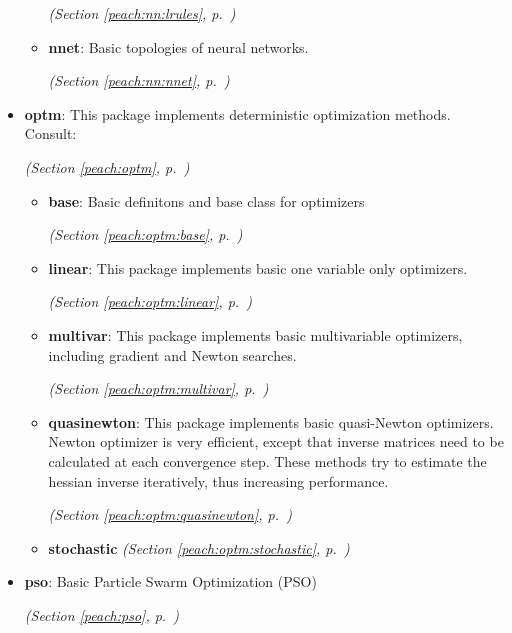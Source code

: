 \begin{itemize}
\begin{itemize}
  \textit{(Section \ref{peach:nn:lrules}, p.~\pageref{peach:nn:lrules})}

    \item \textbf{nnet}: 
Basic topologies of neural networks.


  \textit{(Section \ref{peach:nn:nnet}, p.~\pageref{peach:nn:nnet})}

  \end{itemize}
\item \textbf{optm}: 
This package implements deterministic optimization methods. Consult:


  \textit{(Section \ref{peach:optm}, p.~\pageref{peach:optm})}

  \begin{itemize}
\setlength{\parskip}{0ex}
    \item \textbf{base}: 
Basic definitons and base class for optimizers


  \textit{(Section \ref{peach:optm:base}, p.~\pageref{peach:optm:base})}

    \item \textbf{linear}: 
This package implements basic one variable only optimizers.


  \textit{(Section \ref{peach:optm:linear}, p.~\pageref{peach:optm:linear})}

    \item \textbf{multivar}: 
This package implements basic multivariable optimizers, including gradient and
Newton searches.


  \textit{(Section \ref{peach:optm:multivar}, p.~\pageref{peach:optm:multivar})}

    \item \textbf{quasinewton}: 
This package implements basic quasi-Newton optimizers. Newton optimizer is very
efficient, except that inverse matrices need to be calculated at each
convergence step. These methods try to estimate the hessian inverse iteratively,
thus increasing performance.


  \textit{(Section \ref{peach:optm:quasinewton}, p.~\pageref{peach:optm:quasinewton})}

    \item \textbf{stochastic}
  \textit{(Section \ref{peach:optm:stochastic}, p.~\pageref{peach:optm:stochastic})}

  \end{itemize}
\item \textbf{pso}: 
Basic Particle Swarm Optimization (PSO)


  \textit{(Section \ref{peach:pso}, p.~\pageref{peach:pso})}


\end{itemize}
